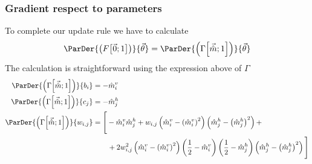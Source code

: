 \subsubsection{Gradient respect to parameters}
To complete our update rule we have to calculate
\[
  \ParDer{\left(\FEn{\vec{0}}{1}\right)}{\vec{\theta}} =
  \ParDer{\left(\Gam{\vec{\hat{m}}}{1}\right)}{\vec{\theta}}
\]  
The calculation is straightforward using the expression above of \(\Gamma\)
\begin{align*}
  \ParDer{\left(\Gam{\vec{\hat{m}}}{1}\right)}{b_i} &= -\hmvi\\
  \ParDer{\left(\Gam{\vec{\hat{m}}}{1}\right)}{c_j} &= -\hmhj\\
  \ParDer{\left(\Gam{\vec{\hat{m}}}{1}\right)}{w_{i,j}}
    &=\Bigg[-\hmvi\hmhj +w_{i,j}\left(\hmvi-\hmvisq\right)\left(\hmhj-\hmhjsq\right)+\\
    &\qquad+2w_{i,j}^2\left(\hmvi-\hmvisq\right)\left(\frac{1}{2}-\hmvi\right)\left(\frac{1}{2}-\hmhj\right)
      \left(\hmhj-\hmhjsq\right)\Bigg]
\end{align*}
